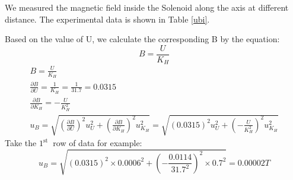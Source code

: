 \documentclass[12pt,a4paper]{article}
\begin{document}
We measured the magnetic field inside the Solenoid along the axis at different distance. The experimental data is shown in Table \ref{ubi}. \par 
Based on the value of U, we calculate the corresponding B by the equation:
$$B=\frac{U}{K_H}$$
$$
\begin{array}{c}
B=\frac{U}{K_{H}} \\
\frac{\partial B}{\partial U}=\frac{1}{K_{H}}=\frac{1}{31.7}=0.0315 \\
\frac{\partial B}{\partial K_{H}}=-\frac{U}{K_{H}^{2}} \\
u_{B}=\sqrt{\left(\frac{\partial B}{\partial U}\right)^{2} u_{U}^{2}+\left(\frac{\partial B}{\partial K_{H}}\right)^{2} u_{K_{H}}^{2}}=\sqrt{(0.0315)^{2} u_{U}^{2}+\left(-\frac{U}{K_{H}^{2}}\right)^{2} u_{K_{H}}^{2}}
\end{array}
$$
Take the $1^{\text {st }}$ row of data for example:
$$
u_{B}=\sqrt{(0.0315)^{2} \times 0.0006^{2}+\left(-\frac{0.0114}{31.7^{2}}\right)^{2} \times 0.7^{2}}=0.00002 T
$$
\end{document}
